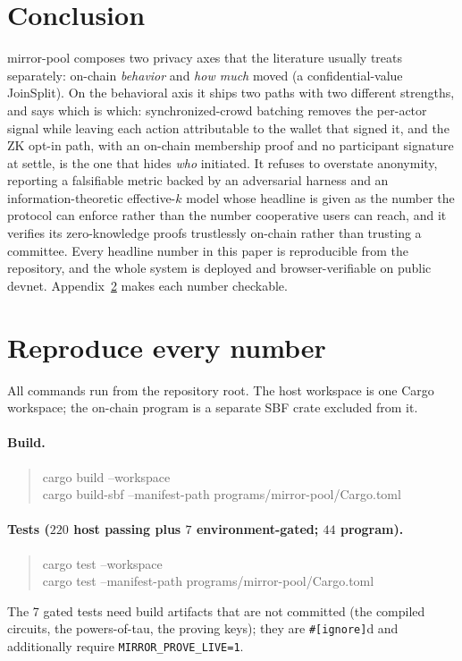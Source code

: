 \documentclass[10pt]{article}
\newcommand{\code}[1]{\texttt{#1}}
\begin{document}
\section{Conclusion}

mirror-pool composes two privacy axes that the literature usually treats
separately: on-chain \emph{behavior} and \emph{how much} moved (a
confidential-value JoinSplit). On the behavioral axis it ships two paths with two
different strengths, and says which is which: synchronized-crowd batching removes
the per-actor signal while leaving each action attributable to the wallet that
signed it, and the ZK opt-in path, with an on-chain membership proof and no
participant signature at settle, is the one that hides \emph{who} initiated. It
refuses to overstate anonymity, reporting a falsifiable metric backed by an
adversarial harness and an information-theoretic effective-$k$ model whose headline
is given as the number the protocol can enforce rather than the number cooperative
users can reach, and it verifies its zero-knowledge proofs trustlessly on-chain
rather than trusting a committee. Every headline
number in this paper is reproducible from the repository, and the whole system is
deployed and browser-verifiable on public devnet. Appendix~\ref{app:repro} makes
each number checkable.

\appendix
\section{Reproduce every number}
\label{app:repro}

All commands run from the repository root. The host workspace is one Cargo
workspace; the on-chain program is a separate SBF crate excluded from it.

\paragraph{Build.}
\begin{quote}\footnotesize\ttfamily
cargo build --workspace\\
cargo build-sbf --manifest-path programs/mirror-pool/Cargo.toml
\end{quote}

\paragraph{Tests ($220$ host passing plus $7$ environment-gated; $44$ program).}
\begin{quote}\footnotesize\ttfamily
cargo test --workspace\\
cargo test --manifest-path programs/mirror-pool/Cargo.toml
\end{quote}
The 7 gated tests need build artifacts that are not committed (the compiled
circuits, the powers-of-tau, the proving keys); they are \code{\#[ignore]}d and
additionally require \code{MIRROR\_PROVE\_LIVE=1}.
\end{document}

